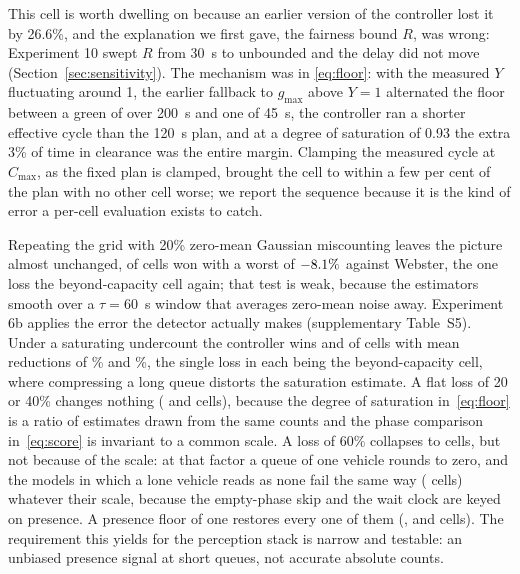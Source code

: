 \documentclass[journal]{IEEEtran}
\begin{document}
This cell is worth dwelling on because an earlier version of the controller lost it by 26.6\%, and the
explanation we first gave, the fairness bound $R$, was wrong: Experiment 10 swept $R$ from 30~s to unbounded
and the delay did not move (Section~\ref{sec:sensitivity}). The mechanism was in \eqref{eq:floor}: with the
measured $Y$ fluctuating around 1, the earlier fallback to $g_{\max}$ above $Y = 1$ alternated the floor
between a green of over 200~s and one of 45~s, the controller ran a shorter effective cycle than the 120~s
plan, and at a degree of saturation of 0.93 the extra 3\% of time in clearance was the entire margin.
Clamping the measured cycle at $C_{\max}$, as the fixed plan is clamped, brought the cell to within a few per
cent of the plan with no other cell worse; we report the sequence because it is the kind of error a per-cell
evaluation exists to catch.

Repeating the grid with 20\% zero-mean Gaussian miscounting leaves the picture almost unchanged,
\GridNoiseWins{} of \GridCells{} cells won with a worst of $-8.1\%$ against Webster, the
one loss the beyond-capacity cell again; that test is weak, because the estimators smooth over a
$\tau = 60$~s window that averages zero-mean noise away. Experiment 6b applies the error the detector
actually makes (supplementary Table~S5). Under a saturating undercount the controller wins
\BiasSaturatingQEightWins{} and \BiasSaturatingQFourWins{} of \GridCells{} cells with mean reductions of
\BiasSaturatingQEightMeanWebster\% and \BiasSaturatingQFourMeanWebster\%, the single loss in each being the
beyond-capacity cell, where compressing a long queue distorts the saturation estimate. A flat loss of 20 or
40\% changes nothing (\BiasScaleZeroEightWins{} and \BiasScaleZeroSixWins{} cells), because the degree of
saturation in~\eqref{eq:floor} is a ratio of estimates drawn from the same counts and the phase comparison
in~\eqref{eq:score} is invariant to a common scale. A loss of 60\% collapses to \BiasScaleZeroFourWins{}
cells, but not because of the scale: at that factor a queue of one vehicle rounds to zero, and the models in
which a lone vehicle reads as none fail the same way (\BiasFloorZeroEightWins{} cells) whatever their scale,
because the empty-phase skip and the wait clock are keyed on presence. A presence floor of one restores
every one of them (\BiasScaleZeroFourKeepOneWins, \BiasFloorZeroEightKeepOneWins{} and
\BiasFloorZeroSixKeepOneWins{} cells). The requirement this yields for the perception stack is narrow and
testable: an unbiased presence signal at short queues, not accurate absolute counts.
\end{document}
